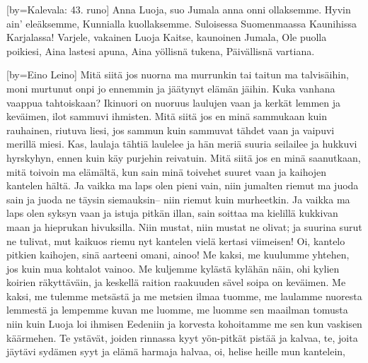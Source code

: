 [by={Kalevala: 43. runo}]
  \beginverse
    Anna Luoja, suo Jumala
    anna onni ollaksemme.
  \endverse
  \beginverse
    Hyvin ain’ eleäksemme,
    Kunnialla kuollaksemme.
  \endverse
  \beginverse
    Suloisessa Suomenmaassa
    Kaunihissa Karjalassa!
  \endverse
  \beginverse
    Varjele, vakainen Luoja
    Kaitse, kaunoinen Jumala,
  \endverse
  \beginverse
    Ole puolla poikiesi,
    Aina lastesi apuna,
  \endverse
  \beginverse
    Aina yöllisnä tukena,
    Päivällisnä vartiana.
  \endverse  
\endsong


[by={Eino Leino}]
  \beginverse
    Mitä siitä jos nuorna ma murrunkin
    tai taitun ma talvisäihin,
    moni murtunut onpi jo ennemmin
    ja jäätynyt elämän jäihin.
    Kuka vanhana vaappua tahtoiskaan?
    Ikinuori on nuoruus laulujen vaan
    ja kerkät lemmen ja keväimen,
    ilot sammuvi ihmisten.
  \endverse
  \beginverse
    Mitä siitä jos en minä sammukaan
    kuin rauhainen, riutuva liesi,
    jos sammun kuin sammuvat tähdet vaan
    ja vaipuvi merillä miesi.
    Kas, laulaja tähtiä laulelee
    ja hän meriä suuria seilailee
    ja hukkuvi hyrskyhyn, ennen kuin
    käy purjehin reivatuin.
  \endverse
  \beginverse
    Mitä siitä jos en minä saanutkaan,
    mitä toivoin ma elämältä,
    kun sain minä toivehet suuret vaan
    ja kaihojen kantelen hältä.
    Ja vaikka ma laps olen pieni vain,
    niin jumalten riemut ma juoda sain
    ja juoda ne täysin siemauksin--
    niin riemut kuin murheetkin.
  \endverse
  \beginverse
    Ja vaikka ma laps olen syksyn vaan
    ja istuja pitkän illan,
    sain soittaa ma kielillä kukkivan maan
    ja hieprukan hivuksilla.
    Niin mustat, niin mustat ne olivat;
    ja suurina surut ne tulivat,
    mut kaikuos riemu nyt kantelen
    vielä kertasi viimeisen!
  \endverse
  \beginverse
    Oi, kantelo pitkien kaihojen,
    sinä aarteeni omani, ainoo!
    Me kaksi, me kuulumme yhtehen,
    jos kuin mua kohtalot vainoo.
    Me kuljemme kylästä kylähän näin,
    ohi kylien koirien räkyttäväin,
    ja keskellä raition raakuuden
    sävel soipa on keväimen.
  \endverse
  \beginverse
    Me kaksi, me tulemme metsästä
    ja me metsien ilmaa tuomme,
    me laulamme nuoresta lemmestä
    ja lempemme kuvan me luomme,
    me luomme sen maailman tomusta niin
    kuin Luoja loi ihmisen Eedeniin
    ja korvesta kohoitamme me sen
    kun vaskisen käärmehen.
  \endverse
  \beginverse
    Te ystävät, joiden rinnassa kyyt
    yön-pitkät pistää ja kalvaa,
    te, joita jäytävi sydämen syyt
    ja elämä harmaja halvaa,
    oi, helise heille mun kantelein,

